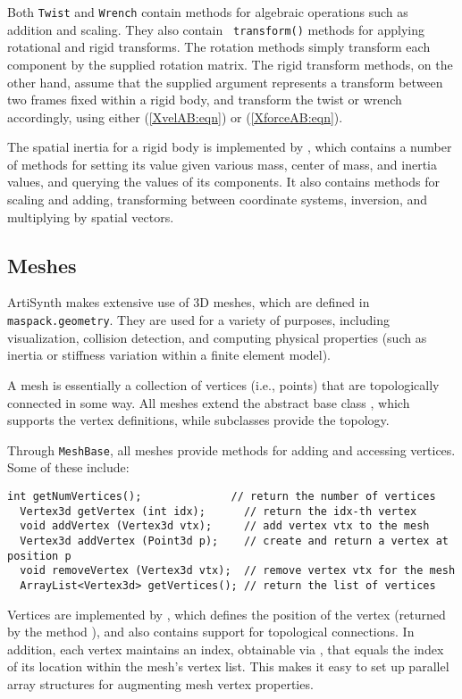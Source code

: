 Both {\tt Twist} and {\tt Wrench} contain methods for algebraic
operations such as addition and scaling. They also contain {\tt
transform()} methods for applying rotational and rigid transforms.
The rotation methods simply transform each component by the supplied
rotation matrix. The rigid transform methods, on the other hand,
assume that the supplied argument represents a transform between two
frames fixed within a rigid body, and transform the twist or wrench
accordingly, using either (\ref{XvelAB:eqn}) or (\ref{XforceAB:eqn}).

The spatial inertia for a rigid body is implemented by
, which contains a
number of methods for setting its value given various mass, center of
mass, and inertia values, and querying the values of its components.
It also contains methods for scaling and adding, transforming between
coordinate systems, inversion, and multiplying by spatial vectors.

\subsection{Meshes}
\label{Meshes:sec}

ArtiSynth makes extensive use of 3D meshes, which are defined in {\tt
maspack.geometry}.  They are used for a variety of purposes, including
visualization, collision detection, and computing physical properties
(such as inertia or stiffness variation within a finite element
model).

A mesh is essentially a collection of vertices
(i.e., points) that are topologically connected in some way.  All
meshes extend the abstract base class
, which supports the vertex
definitions, while subclasses provide the topology.

Through {\tt MeshBase}, all meshes provide methods for
adding and accessing vertices. Some of these include:
%
\begin{lstlisting}[]
  int getNumVertices();              // return the number of vertices
  Vertex3d getVertex (int idx);      // return the idx-th vertex
  void addVertex (Vertex3d vtx);     // add vertex vtx to the mesh
  Vertex3d addVertex (Point3d p);    // create and return a vertex at position p
  void removeVertex (Vertex3d vtx);  // remove vertex vtx for the mesh
  ArrayList<Vertex3d> getVertices(); // return the list of vertices
\end{lstlisting}
%
Vertices are implemented by ,
which defines the position of the vertex (returned by the method
), and also
contains support for topological connections. In addition, each vertex
maintains an index, obtainable via
, that equals the
index of its location within the mesh's vertex list. This makes it
easy to set up parallel array structures for augmenting mesh vertex
properties.

